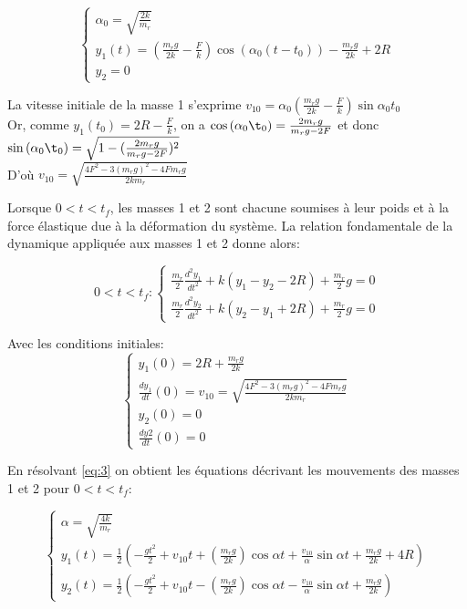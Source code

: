 \begin{equation}
  \begin{cases}
    \alpha_0=\sqrt{\frac{2k}{m_r}}\\
    y_1(t)=(\frac{m_r g}{2k}-\frac{F}{k})\cos(\alpha_0(t-t_0))-\frac{m_r g}{2k}+2R \\
    y_2=0
  \end{cases}
  \label{eq:2}
\end{equation}

La vitesse initiale de la masse 1 s'exprime $v_{10}=\alpha_0(\frac{m_r g}{2k}-\frac{F}{k})\sin{\alpha_0 t_0}$ \\

Or, comme $y_1(t_0)=2R-\frac{F}{k}$, on a $\cos{(\alpha_0 \t_0)}=\frac{2m_rg}{m_rg-2F}$ et donc $\sin{(\alpha_0 \t_0)}=\sqrt{1-(\frac{2m_rg}{m_rg-2F})^2}$ \\
D'où $v_{10}=\sqrt{\frac{4F^2 -3(m_r g)^2-4Fm_rg}{2 k m_r}}$

Lorsque $0<t<t_f$, les masses 1 et 2 sont chacune soumises à leur poids et à la force élastique due à la déformation du système.
La relation fondamentale de la dynamique appliquée aux masses 1 et 2 donne alors:

\begin{equation}
   0<t<t_f: 
  \begin{cases}
    \frac{m_r}{2}\frac{d^2y_1}{dt^2}+k(y_1-y_2-2R)+\frac{m_r}{2}g=0\\
    \frac{m_r}{2}\frac{d^2y_2}{dt^2}+k(y_2-y_1+2R)+\frac{m_r}{2}g=0
  \end{cases}
  \label{eq:3}
\end{equation}

Avec les conditions initiales: 
\begin{equation}
  \begin{cases}
    y_1(0)=2R+\frac{m_r g}{2k}\\
    \frac{d y_1}{dt}(0)=v_{10}=\sqrt{\frac{4F^2 -3(m_r g)^2-4Fm_rg}{2 k m_r}}\\
    y_2(0)=0 \\
    \frac{d y2}{dt}(0)=0
  \end{cases}
  \label{eq:4}
\end{equation}

En résolvant \ref{eq:3} on obtient les équations décrivant les mouvements des masses 1 et 2 pour $0<t<t_f$:

\begin{equation}
  \begin{cases}
    \alpha=\sqrt{\frac{4k}{m_r}}\\
    y_1(t)=\frac{1}{2}(-\frac{g t^2}{2}+v_{10}t+(\frac{m_r g}{2k})\cos{\alpha t}+\frac{v_{10}}{\alpha}\sin{\alpha t}+\frac{m_r g}{2k}+4R) \\
    y_2(t)=\frac{1}{2}(-\frac{g t^2}{2}+v_{10}t-(\frac{m_r g}{2k})\cos{\alpha t}-\frac{v_{10}}{\alpha}\sin{\alpha t}+\frac{m_r g}{2k}) 
  \end{cases}
  \label{eq:5}
\end{equation}

